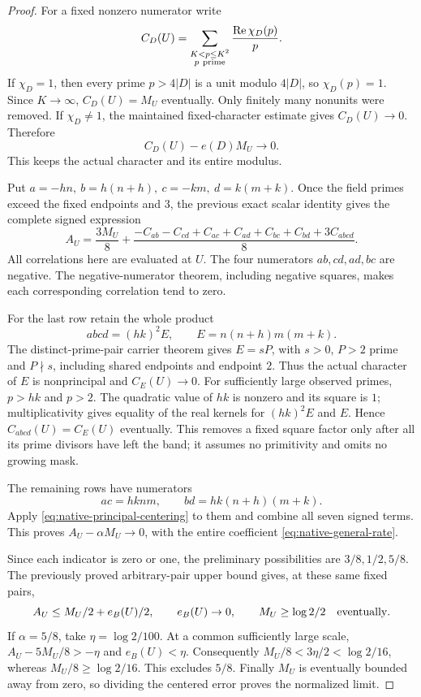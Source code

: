 \documentclass[11pt]{article}
\begin{document}
\begin{proof}
For a fixed nonzero numerator write
\[
 C_D(U)=\sum_{\substack{K<p\le K^2\\p\ {\rm prime}}}
                         \frac{\operatorname{Re}\chi_D(p)}p.
\]
If \(\chi_D=1\), then every prime \(p>4|D|\) is a unit modulo
\(4|D|\), so \(\chi_D(p)=1\). Since \(K\to\infty\),
\(C_D(U)=M_U\) eventually. Only finitely many nonunits were removed.
If \(\chi_D\ne1\), the maintained fixed-character estimate gives
\(C_D(U)\to0\). Therefore
\begin{equation}\label{eq:native-principal-centering}
                         C_D(U)-e(D)M_U\longrightarrow0.
\end{equation}
This keeps the actual character and its entire modulus.

Put \(a=-hn,\ b=h(n+h),\ c=-km,\ d=k(m+k)\).
Once the field primes exceed the fixed endpoints and \(3\), the
previous exact scalar identity gives the complete signed expression
\[
 A_U=\frac{3M_U}{8}
 +\frac{-C_{ab}-C_{cd}+C_{ac}+C_{ad}+C_{bc}+C_{bd}+3C_{abcd}}8.
\]
All correlations here are evaluated at \(U\). The four numerators
\(ab,cd,ad,bc\) are negative. The negative-numerator theorem, including
negative squares, makes each corresponding correlation tend to zero.

For the last row retain the whole product
\[
                       abcd=(hk)^2E,\qquad E=n(n+h)m(m+k).
\]
The distinct-prime-pair carrier theorem gives \(E=sP\), with \(s>0\),
\(P>2\) prime and \(P\nmid s\), including shared endpoints and endpoint
\(2\). Thus the actual character of \(E\) is nonprincipal and
\(C_E(U)\to0\).
For sufficiently large observed primes, \(p>hk\) and \(p>2\).
The quadratic value of \(hk\) is nonzero and its square is \(1\);
multiplicativity gives equality of the real kernels for
\((hk)^2E\) and \(E\). Hence \(C_{abcd}(U)=C_E(U)\) eventually.
This removes a fixed square factor only after all its prime divisors
have left the band; it assumes no primitivity and omits no growing mask.

The remaining rows have numerators
\[
                         ac=hknm,\qquad bd=hk(n+h)(m+k).
\]
Apply \eqref{eq:native-principal-centering} to them and combine all
seven signed terms. This proves \(A_U-\alpha M_U\to0\), with
the entire coefficient \eqref{eq:native-general-rate}.

Since each indicator is zero or one, the preliminary possibilities are
\(3/8,1/2,5/8\). The previously proved arbitrary-pair upper bound gives,
at these same fixed pairs,
\[
 A_U\le M_U/2+e_B(U)/2,\qquad e_B(U)\to0,\qquad
 M_U\ge\log2/2\quad\hbox{eventually}.
\]
If \(\alpha=5/8\), take \(\eta=\log2/100\).
At a common sufficiently large scale,
\(A_U-5M_U/8>-\eta\) and \(e_B(U)<\eta\).
Consequently \(M_U/8<3\eta/2<\log2/16\), whereas
\(M_U/8\ge\log2/16\). This excludes \(5/8\).
Finally \(M_U\) is eventually bounded away from zero, so dividing
the centered error proves the normalized limit.
\end{proof}
\end{document}
